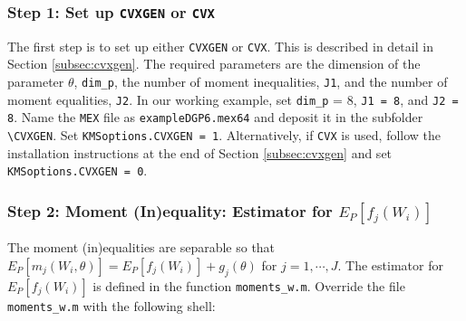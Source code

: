 \documentclass[12pt]{article}
\def\code#1{\texttt{#1}}
\begin{document}
\subsubsection*{Step 1: Set up \code{CVXGEN} or \code{CVX}}

The first step is to set up either \code{CVXGEN} or \code{CVX}.  This is described in detail in Section \ref{subsec:cvxgen}.  The required parameters are the dimension of the parameter $\theta$, \code{dim\_p}, the number of moment inequalities, \code{J1}, and the number of moment equalities, \code{J2}.  In our working example, set \code{dim\_p} = 8, \code{J1 = 8}, and \code{J2 = 8}.  Name the \code{MEX} file as \code{exampleDGP6.mex64} and deposit it in the subfolder \code{\textbackslash CVXGEN}.  Set \code{KMSoptions.CVXGEN = 1}.  Alternatively, if \code{CVX} is used, follow the installation instructions at the end of Section \ref{subsec:cvxgen} and set \code{KMSoptions.CVXGEN = 0}.

\subsubsection*{Step 2: Moment (In)equality: Estimator for $E_P[f_j(W_i)]$}

The moment (in)equalities are separable so that $E_P[m_j(W_i,\theta)] = E_P[f_j(W_i)] + g_j(\theta)$ for $j=1,\cdots,J$.  The estimator for $E_P[f_j(W_i)]$ is defined in the function \code{moments\_w.m}.  Override the  file \code{moments\_w.m} with the following shell:
\end{document}
